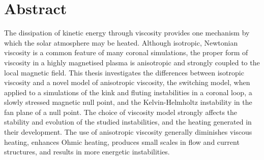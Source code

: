 \chapter{Abstract}

The dissipation of kinetic energy through viscosity provides one mechanism by which the solar atmosphere may be heated. Although isotropic, Newtonian viscosity is a common feature of many coronal simulations, the proper form of viscosity in a highly magnetised plasma is anisotropic and strongly coupled to the local magnetic field. This thesis investigates the differences between isotropic viscosity and a novel model of anisotropic viscosity, the switching model, when applied to a simulations of the kink and fluting instabilities in a coronal loop, a slowly stressed magnetic null point, and the Kelvin-Helmholtz instability in the fan plane of a null point. The choice of viscosity model strongly affects the stability and evolution of the studied instabilities, and the heating generated in their development. The use of anisotropic viscosity generally diminishes viscous heating, enhances Ohmic heating, produces small scales in flow and current structures, and results in more energetic instabilities.
